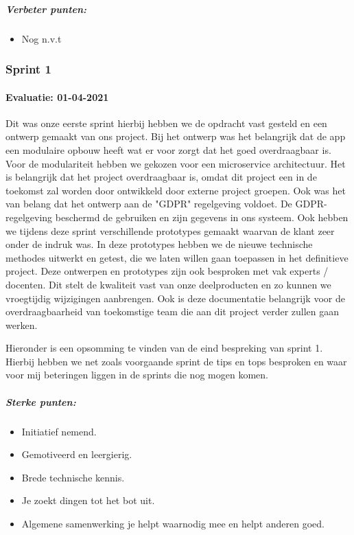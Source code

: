 	\subparagraph{Verbeter punten:}
	\begin{itemize}
		\setlength{\itemsep}{0pt}%
		\setlength{\parskip}{0pt}%
		\item Nog n.v.t
	\end{itemize}



	\subsubsection{Sprint 1}
	\paragraph{Evaluatie: 01-04-2021}
	Dit was onze eerste sprint hierbij hebben we de opdracht vast gesteld en een ontwerp gemaakt van ons project.
	Bij het ontwerp was het belangrijk dat de app een modulaire opbouw heeft wat er voor zorgt dat het goed overdraagbaar is.
	Voor de modulariteit hebben we gekozen voor een microservice architectuur.
	Het is belangrijk dat het project overdraagbaar is, omdat dit project een in de toekomst zal worden door ontwikkeld door externe project groepen.
	Ook was het van belang dat het ontwerp aan de "GDPR" regelgeving voldoet.
	De GDPR-regelgeving beschermd de gebruiken en zijn gegevens in ons systeem.
	Ook hebben we tijdens deze sprint verschillende prototypes gemaakt waarvan de klant zeer onder de indruk was.
	In deze prototypes hebben we de nieuwe technische methodes uitwerkt en getest, die we laten willen gaan toepassen in het definitieve project.
	Deze ontwerpen en prototypes zijn ook besproken met vak experts / docenten.
	Dit stelt de kwaliteit vast van onze deelproducten en zo kunnen we vroegtijdig wijzigingen aanbrengen.
	Ook is deze documentatie belangrijk voor de overdraagbaarheid van toekomstige team die aan dit project verder
	zullen gaan werken.


	Hieronder is een opsomming te vinden van de eind bespreking van sprint 1.
	Hierbij hebben we net zoals voorgaande sprint de tips en tops besproken en waar voor mij beteringen liggen in de
	sprints die nog mogen komen.
	\subparagraph{Sterke punten:}
	\begin{itemize}
		\setlength{\itemsep}{0pt}%
		\setlength{\parskip}{0pt}%
		\item Initiatief nemend.
		\item Gemotiveerd en leergierig.
		\item Brede technische kennis.
		\item Je zoekt dingen tot het bot uit.
		\item Algemene samenwerking je helpt waarnodig mee en helpt anderen goed.
	\end{itemize}

